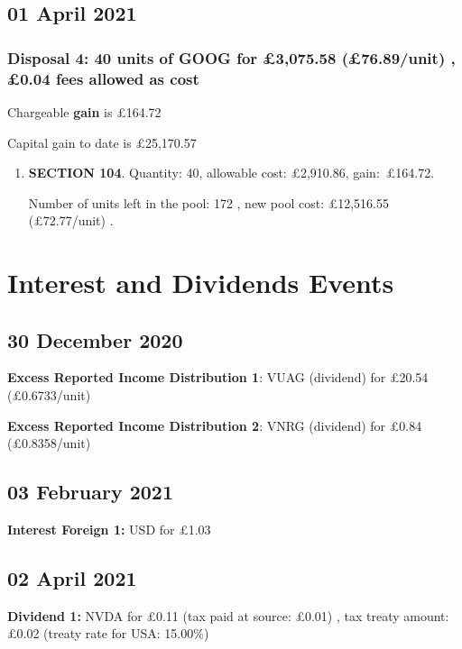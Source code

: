 \documentclass{article}
\begin{document}
\subsection*{01 April 2021}
\subsubsection*{
    Disposal 4: 40 units of GOOG
for £3,075.58
    (£76.89/unit)%
    , £0.04 fees allowed as cost
}
Chargeable \textbf{gain} is £164.72

Capital gain to date is £25,170.57

\begin{enumerate}
\item \textbf{SECTION 104}. Quantity: 40,
    allowable
    cost:
    £2,910.86,
    \mbox{gain: £164.72.}

    Number of units left in the pool:
    172%
,
    new pool cost: £12,516.55
    (£72.77/unit)%
.

\end{enumerate}



\clearpage
\section*{Interest and Dividends Events}


\subsection*{30 December 2020}
\textbf{Excess Reported Income Distribution 1}: VUAG (dividend) for £20.54
(£0.6733/unit)%

\textbf{Excess Reported Income Distribution 2}: VNRG (dividend) for £0.84
(£0.8358/unit)%



\subsection*{03 February 2021}
\textbf{Interest Foreign 1:} USD for £1.03



\subsection*{02 April 2021}
\textbf{Dividend 1:} NVDA for £0.11
(tax paid at source: £0.01)
, tax treaty amount: £0.02 (treaty rate for USA: 15.00\%)
\end{document}
